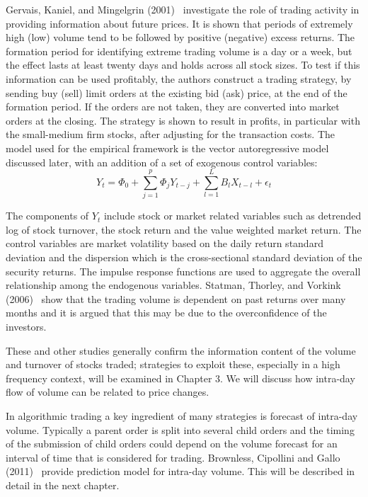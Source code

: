 Gervais, Kaniel, and Mingelgrin (2001)~\cite{gervais2001high} investigate the role of trading activity in providing information about future prices. It is shown that periods of extremely high (low) volume tend to be followed by positive (negative) excess returns. The formation period for identifying extreme trading volume is a day or a week, but the effect lasts at least twenty days and holds across all stock sizes. To test if this information can be used profitably, the authors construct a trading strategy, by sending buy (sell) limit orders at the existing bid (ask) price, at the end of the formation period. If the orders are not taken, they are converted into market orders at the closing. The strategy is shown to result in profits, in particular with the small-medium firm stocks, after adjusting for the transaction costs. The model used for the empirical framework is the vector autoregressive model discussed later, with an addition of a set of exogenous control variables:
	\begin{equation}\label{eqn:2Ytphi}
Y_t = \Phi_0+\sum_{j=1}^p\Phi_jY_{t-j}+\sum_{l=1}^LB_lX_{t-l}+\epsilon_t
	\end{equation}


The components of $Y_t$ include stock or market related variables such as detrended log of stock turnover, the stock return and the value weighted market return. The control variables are market volatility based on the daily return standard deviation and the dispersion which is the cross-sectional standard deviation of the security returns. The impulse response functions are used to aggregate the overall relationship among the endogenous variables. Statman, Thorley, and Vorkink (2006)~\cite{statman2006investor} show that the trading volume is dependent on past returns over many months and it is argued that this may be due to the overconfidence of the investors.


These and other studies generally confirm the information content of the volume and turnover of stocks traded; strategies to exploit these, especially in a high frequency context, will be examined in Chapter 3. We will discuss how intra-day flow of volume can be related to price changes. 


In algorithmic trading a key ingredient of many strategies is forecast of intra-day volume. Typically a parent order is split into several child orders and the timing of the submission of child orders could depend on the volume forecast for an interval of time that is considered for trading. Brownless, Cipollini and Gallo (2011)~\cite{brownless} provide prediction model for intra-day volume. This will be described in detail in the next chapter.


